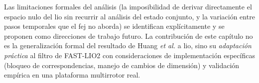 Las limitaciones formales del análisis (la imposibilidad de derivar
directamente el espacio nulo del \gls{lio} sin recurrir al análisis del estado
conjunto, y la variación entre pasos temporales que el \gls{fej} no aborda) se
identifican explícitamente y se proponen como direcciones de trabajo futuro.
La contribución de este capítulo no es la generalización formal del resultado
de Huang \emph{et al.} a \gls{lio}, sino su \emph{adaptación práctica} al
filtro de FAST-LIO2 con consideraciones de implementación específicas (bloqueo
de correspondencias, manejo de cambios de dimensión) y validación empírica en
una plataforma multirrotor real.
